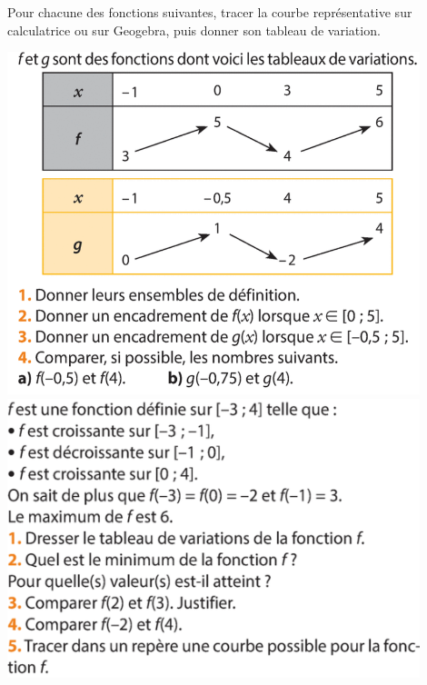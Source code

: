 \documentclass{exam}
\begin{document}
\begin{minipage}{0.45\textwidth}
\begin{questions}
\question Pour chacune des fonctions suivantes, tracer la courbe représentative sur calculatrice ou sur Geogebra, puis donner son tableau de variation.
\question
\includegraphics[width=0.9\textwidth]{Exo4.png}
\question
\includegraphics[width=0.9\textwidth]{Exo3.png}
\end{questions}
\end{minipage}
\newpage
\end{document}
